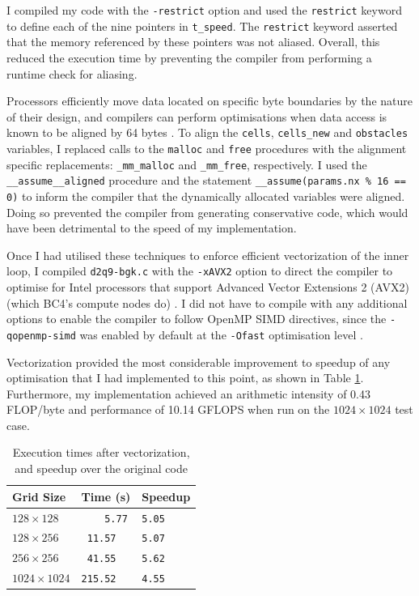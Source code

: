 \documentclass[twocolumn, a4paper]{article}
\begin{document}
I compiled my code with the \texttt{-restrict} option and used the \texttt{restrict} keyword to define each of the nine pointers in \texttt{t\_speed}.
The \texttt{restrict} keyword asserted that the memory referenced by these pointers was not aliased.
Overall, this reduced the execution time by preventing the compiler from performing a runtime check for aliasing.

Processors efficiently move data located on specific byte boundaries by the nature of their design, and compilers can perform optimisations when data access is known to be aligned by 64 bytes \cite{alignment}.
To align the \texttt{cells}, \texttt{cells\_new} and \texttt{obstacles} variables, I replaced calls to the \texttt{malloc} and \texttt{free} procedures with the alignment specific replacements: \texttt{\_mm\_malloc} and \texttt{\_mm\_free}, respectively.
I used the \texttt{\_\_assume\_\_aligned} procedure and  the statement \texttt{\_\_assume(params.nx \% 16 == 0)} to inform the compiler that the dynamically allocated variables were aligned.
Doing so prevented the compiler from generating conservative code, which would have been detrimental to the speed of my implementation.

Once I had utilised these techniques to enforce efficient vectorization of the inner loop, I compiled \texttt{d2q9-bgk.c} with the \texttt{-xAVX2} option to direct the compiler to optimise for Intel processors that support Advanced Vector Extensions 2 (AVX2) (which BC4's compute nodes do) \cite{lenovo}.
I did not have to compile with any additional options to enable the compiler to follow OpenMP SIMD directives, since the \texttt{-qopenmp-simd} was enabled by default at the \texttt{-Ofast} optimisation level \cite{icc}.

Vectorization provided the most considerable improvement to speedup of any optimisation that I had implemented to this point, as shown in Table \ref{tab:vectorized}.
Furthermore, my implementation achieved an arithmetic intensity of 0.43 FLOP/byte and performance of 10.14 GFLOPS when run on the $1024\times1024$ test case.

\begin{table}[htbp]
  \begin{center}
  \caption{Execution times after vectorization, and speedup over the original code}\label{tab:vectorized}
  \begin{tabular}{l | l l} 
      \hline\hline
      Grid Size&Time (s)&Speedup\\
      \hline
      $128 \times 128$&\texttt{  \,\,\,5.77}&\texttt{5.05}\\
      $128 \times 256$&\texttt{ 11.57}&\texttt{5.07}\\
      $256 \times 256$&\texttt{ 41.55}&\texttt{5.62}\\
      $1024 \times 1024$&\texttt{215.52}&\texttt{4.55}\\
      \hline
    \end{tabular}
  \end{center}
\end{table}
\end{document}
